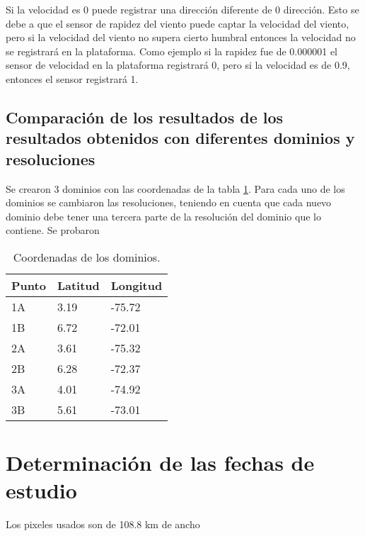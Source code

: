 \documentclass[11pt]{article}
\begin{document}
Si la velocidad es 0 puede registrar una dirección diferente de 0 dirección. Esto se debe a que el sensor de rapidez del viento puede captar la velocidad del viento, pero si la velocidad del viento no supera cierto humbral entonces la velocidad no se registrará en la plataforma. Como ejemplo si la rapidez fue de 0.000001 el sensor de velocidad en la plataforma registrará 0, pero si la velocidad es de 0.9, entonces el sensor registrará 1.

\subsection{Comparación de los resultados de los resultados obtenidos con diferentes dominios y resoluciones}

Se crearon 3 dominios con las coordenadas de la tabla \ref{tabla_coordenadas_dominios}. Para cada uno de los dominios se cambiaron las resoluciones, teniendo en cuenta que cada nuevo dominio debe tener una tercera parte de la resolución del dominio que lo contiene. Se probaron 

\begin{center}

\begin{table}[H]
\begin{tabular}{lll}
Punto & Latitud & Longitud \\ \hline
1A    & 3.19    & -75.72   \\
1B    & 6.72    & -72.01   \\
2A    & 3.61    & -75.32   \\
2B    & 6.28    & -72.37   \\
3A    & 4.01    & -74.92   \\
3B    & 5.61    & -73.01  
\end{tabular}
\caption{Coordenadas de los dominios.}
\label{tabla_coordenadas_dominios}
\end{table}
\end{center}


\section{Determinación de las fechas de estudio}%

Los pixeles usados son de 108.8 km de ancho
\end{document}
